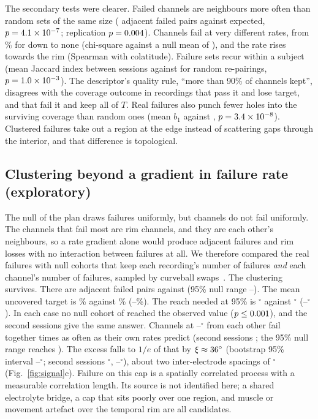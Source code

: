 \documentclass[11pt]{amsart}
\theoremstyle{definition}
\theoremstyle{remark}
\begin{document}
The secondary tests were clearer. Failed channels are neighbours more often
than random sets of the same size (\SoneObs{} adjacent failed pairs against
\SoneNull{} expected, $p=4.1\times 10^{-7}$; replication $p=0.004$). Channels fail at
very different rates, from \maxRate\% for \maxRateName{} down to none
(chi-square \hetChi{} against a null mean of \hetNull{}), and the rate rises
towards the rim (Spearman \hetRho{} with colatitude). Failure sets recur within
a subject (mean Jaccard index \recJac{} between sessions against \recNull{}
for random re-pairings, $p=1.0\times 10^{-3}$). The descriptor's quality rule, ``more
than 90\% of channels kept'', disagrees with the coverage outcome in
\qcPassLost{} recordings that pass it and lose target, and \qcFailIntact{}
that fail it and keep all of $T$. Real failures also punch fewer holes into
the surviving coverage than random ones (mean $b_1$ \holesObs{} against
\holesNull{}, $p=3.4\times 10^{-8}$). Clustered failures take out a region at the edge
instead of scattering gaps through the interior, and that difference is
topological.

\subsection*{Clustering beyond a gradient in failure rate (exploratory)}
The null of the plan draws failures uniformly, but channels do not fail
uniformly. The channels that fail most are rim channels, and they are each
other's neighbours, so a rate gradient alone would produce adjacent failures
and rim losses with no interaction between failures at all. We therefore
compared the real failures with null cohorts that keep each recording's
number of failures \emph{and} each channel's number of failures, sampled by
curveball swaps~\cite{Strona2014}. The clustering survives. There are
\mgAOneObs{} adjacent failed pairs against \mgAOneMargMean{}
(95\% null range \mgAOneMargLo--\mgAOneMargHi). The mean uncovered target is
\mgUOneObs\% against \mgUOneMargMean\% (\mgUOneMargLo--\mgUOneMargHi\%). The
reach needed at 95\% is \mgReachOneObs$^\circ$ against
\mgReachOneMargMean$^\circ$ (\mgReachOneMargLo--\mgReachOneMargHi$^\circ$). In
each case no null cohort of \mgNull{} reached the observed value
($p\le0.001$), and the second sessions give the same answer. Channels at
\gBinLo--\gBinHi$^\circ$ from each other fail together \gFirstOne{} times as
often as their own rates predict (second sessions \gFirstTwo; the 95\% null
range reaches \gNullHiFirst). The excess falls to $1/e$ of that by
$\xi\approx36^\circ$ (bootstrap 95\% interval \xiOneLo--\xiOneHi$^\circ$;
second sessions \xiTwo$^\circ$, \xiTwoLo--\xiTwoHi$^\circ$), about two
inter-electrode spacings of \nnSpacing$^\circ$ (Fig.~\ref{fig:signal}c). Failure on this cap is a
spatially correlated process with a measurable correlation length. Its source
is not identified here; a shared electrolyte bridge, a cap that sits poorly
over one region, and muscle or movement artefact over the temporal rim are all
candidates.
\end{document}
